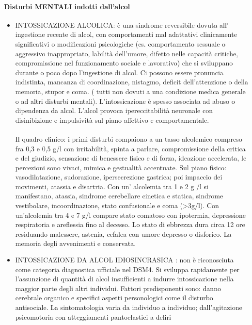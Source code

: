 \paragraph{Disturbi MENTALI indotti dall'alcol}

\begin{itemize}
\item INTOSSICAZIONE ALCOLICA: è una sindrome reversibile dovuta all'
ingestione recente di alcol, con comportamenti mal adattativi
clinicamente significativi o modificazioni psicologiche (es.
comportamento sessuale o aggressivo inappropriato, labilità dell'umore,
difetto nelle capacità critiche, compromissione nel funzionamento
sociale e lavorativo) che si sviluppano durante o poco dopo l'ingestione
di alcol. Ci possono essere pronuncia indistinta, mancanza di
coordinazione, nistagmo, deficit dell'attenzione o della memoria, stupor
e coma. ( tutti non dovuti a una condizione medica generale o ad altri
disturbi mentali). L'intossicazione è spesso associata ad abuso o
dipendenza da alcol. L'alcol provoca ipereccitabilità neuronale con
disinibizione e impulsività sul piano affettivo e comportamentale.
\\\\
Il quadro clinico: i primi disturbi compaiono a un tasso alcolemico
compreso fra 0,3 e 0,5 g/l con irritabilità, spinta a parlare,
compromissione della critica e del giudizio, sensazione di benessere
fisico e di forza, ideazione accelerata, le percezioni sono vivaci,
mimica e gestualità accentuate. Sul piano fisico: vasodilatazione,
sudorazione, ipersecrezione gastrica; poi impaccio dei movimenti,
atassia e disartria. Con un' alcolemia tra 1 e 2 g /l si manifestano,
atassia, sindrome cerebellare cinetica e statica, sindrome vestibolare,
incoordinazione, stato confusionale e coma (\textgreater{}3g/l). Con
un'alcolemia tra 4 e 7 g/l compare stato comatoso con ipotermia,
depressione respiratoria e areflessia fino al decesso. Lo stato di
ebbrezza dura circa 12 ore residuando malessere, astenia, cefalea con
umore depresso o disforico. La memoria degli avvenimenti e conservata.
\item INTOSSICAZIONE DA ALCOL IDIOSINCRASICA : non è riconosciuta come
categoria diagnostica ufficiale nel DSM4. Si sviluppa rapidamente per
l'assunzione di quantità di alcol insufficienti a indurre intossicazione
nella maggior parte degli altri individui. Fattori predisponenti sono:
danno cerebrale organico e specifici aspetti personologici come il
disturbo antisociale. La sintomatologia varia da individuo a individuo;
dall'agitazione psicomotoria con atteggiamenti pantoclastici a deliri

\end{itemize}
